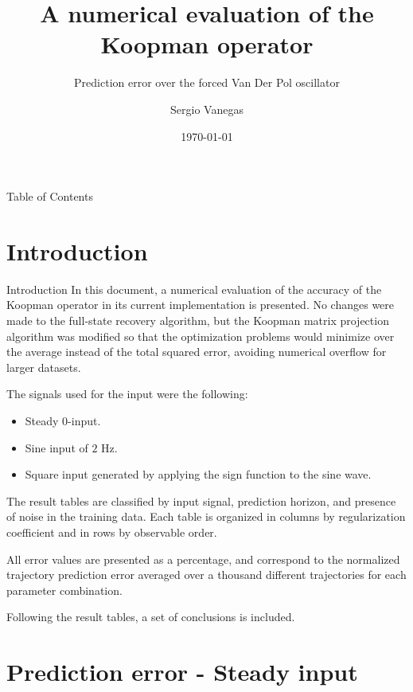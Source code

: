 \documentclass{beamer}
\title[Process]{A numerical evaluation of the Koopman operator}
\subtitle{Prediction error over the forced Van Der Pol oscillator}
\institute[Polimi]{Politecnico di Milano}
\author{Sergio Vanegas}
\date{\today}
\begin{document}
\begin{frame}
    \maketitle
\end{frame}

\begin{frame}{Table of Contents}
    \tableofcontents
\end{frame}


\section{Introduction}

\begin{frame}{Introduction}
    In this document, a numerical evaluation of the accuracy of the Koopman operator in its current implementation is presented. No changes were made to the full-state recovery algorithm, but the Koopman matrix projection algorithm was modified so that the optimization problems would minimize over the average instead of the total squared error, avoiding numerical overflow for larger datasets.

    The signals used for the input were the following:

    \begin{itemize}
        \item Steady 0-input.
        \item Sine input of $2$ Hz.
        \item Square input generated by  applying the sign function to the sine wave.
    \end{itemize}
    
    The result tables are classified by input signal, prediction horizon, and presence of noise in the training data. Each table is organized in columns by regularization coefficient and in rows by observable order. 
    
    All error values are presented as a percentage, and correspond to the normalized trajectory prediction error averaged over a thousand different trajectories for each parameter combination.

    Following the result tables, a set of conclusions is included.
\end{frame}


\section{Prediction error - Steady input}
\end{document}
